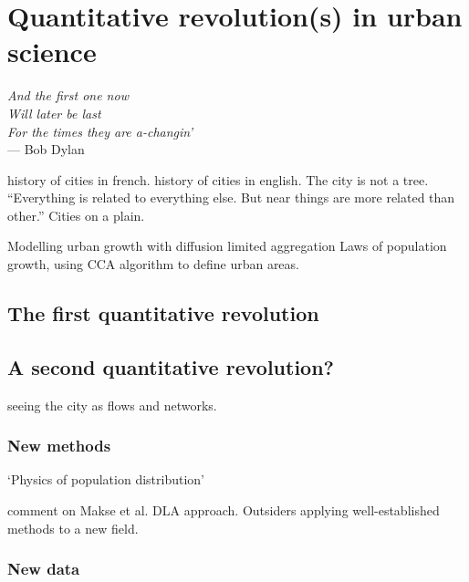 


\chapter{Quantitative revolution(s) in urban science}
\label{chap:quantitative_revolutions}

\begin{flushright}{\slshape    
And the first one now\\
Will later be last\\
For the times they are a-changin'} \\ \medskip
--- Bob Dylan 
\end{flushright}

\cite{Bairoch:1985} history of cities in french.
\cite{Mumford:1961} history of cities in english.
\cite{Alexander:1964} The city is not a tree.
\cite{Tobler:1970} ``Everything is related to everything else. But near things
are more related than other.''
\cite{Glass:1971} Cities on a plain.

\cite{Makse:1995} Modelling urban growth with diffusion limited aggregation
\cite{Rozenfeld:2008} Laws of population growth, using CCA algorithm to define
urban areas.

\section{The first quantitative revolution}
\label{sec:the_first_quantitative_revolution}


\section{A second quantitative revolution?}
\label{sec:a_second_quantitative_revolution_}

\cite{Batty:2008,Batty:2012,Batty:2013} seeing the city as flows and networks.

    \subsection{New methods}
    \label{sub:new_methods}

\cite{Stewart:1959} `Physics of population distribution'

\cite{Batty:1995} comment on Makse et al. DLA approach.
Outsiders applying well-established methods to a new field.
    \subsection{New data}
    \label{sub:new_data}
    
